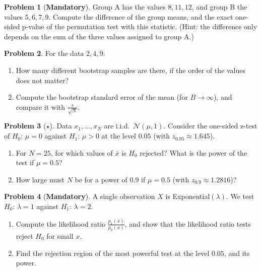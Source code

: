 \documentclass[11pt]{article}
\theoremstyle{definition}
\newtheorem{problem}{Problem}[section]
\newcommand{\mandatory}{\textcolor{red!70!black}{\textbf{Mandatory}}}
\begin{document}
\begin{problem}[\mandatory]\label{pr:permutation}
    Group A has the values $8, 11, 12$, and group B the values $5, 6, 7, 9$. Compute the difference of the group means, and the exact one-sided p-value of the permutation test with this statistic. (Hint: the difference only depends on the sum of the three values assigned to group A.)
\end{problem}

\begin{problem}\label{pr:bootstrap-mean}
    For the data $2, 4, 9$:
    \begin{enumerate}[label=(\alph*)]
        \item How many different bootstrap samples are there, if the order of the values does not matter?
        \item Compute the bootstrap standard error of the mean (for $B \to \infty$), and compare it with $\frac{s}{\sqrt{N}}$.
    \end{enumerate}
\end{problem}

\begin{problem}[$\star$]\label{pr:power}
    Data $x_1, \ldots, x_N$ are i.i.d.\ $\mathcal{N}(\mu, 1)$. Consider the one-sided z-test of $H_0$: $\mu = 0$ against $H_1$: $\mu > 0$ at the level $0.05$ (with $z_{0.95} \approx 1.645$).
    \begin{enumerate}[label=(\alph*)]
        \item For $N = 25$, for which values of $\bar x$ is $H_0$ rejected? What is the power of the test if $\mu = 0.5$?
        \item How large must $N$ be for a power of $0.9$ if $\mu = 0.5$ (with $z_{0.9} \approx 1.2816$)?
    \end{enumerate}
\end{problem}

\begin{problem}[\mandatory]\label{pr:np-practice}
    A single observation $X$ is Exponential$(\lambda)$. We test $H_0$: $\lambda = 1$ against $H_1$: $\lambda = 2$.
    \begin{enumerate}[label=(\alph*)]
        \item Compute the likelihood ratio $\frac{p_1(x)}{p_0(x)}$, and show that the likelihood ratio tests reject $H_0$ for small $x$.
        \item Find the rejection region of the most powerful test at the level $0.05$, and its power.
    \end{enumerate}
\end{problem}
\end{document}
